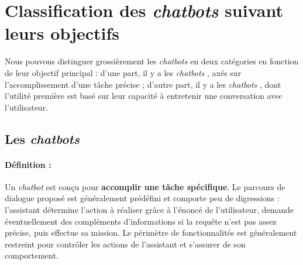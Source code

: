 	
	
	
	
	
	
	
	
	\section{Classification des \textit{chatbots} suivant leurs objectifs}
	\label{annex:B.1-CHATBOT-CLASSIFICATION}
		
		Nous pouvons distinguer grossièrement les \textit{chatbots} en deux catégories en fonction de leur objectif principal :
		d'une part, il y a les \textit{chatbots} , axés sur l'accomplissement d'une tâche précise ;
		d'autre part, il y a les \textit{chatbots} , dont l'utilité première est basé sur leur capacité à entretenir une conversation avec l'utilisateur.
		
		
		\subsection{Les \textit{chatbots} }
		\label{annex:B.1.1-CHATBOT-CLASSIFICATION-TASK-ORIENTED}
		
			\paragraph{Définition :}
				
				Un \textit{chatbot}  est conçu pour \textbf{accomplir une tâche spécifique}.
				Le parcours de dialogue proposé est généralement prédéfini et comporte peu de digressions : l'assistant détermine l'action à réaliser grâce à l'énoncé de l'utilisateur, demande éventuellement des compléments d'informations si la requête n'est pas assez précise, puis effectue sa mission.
				Le périmètre de fonctionnalités est généralement restreint pour contrôler les actions de l'assistant et s'assurer de son comportement.
			
